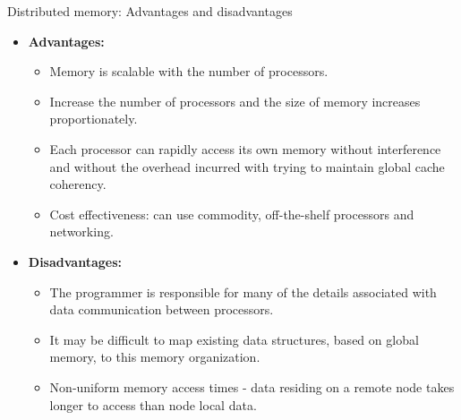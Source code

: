 \documentclass[10pt,times]{beamer}
\begin{document}
\begin{frame}{Distributed memory: Advantages and disadvantages}
\begin{itemize}

\item \textbf{Advantages:}
\begin{itemize}
\item Memory is scalable with the number of processors. 
\item Increase the number of processors and the size of memory increases 
proportionately.
\item Each processor can rapidly access its own memory without interference and 
    without the overhead incurred with trying to maintain global cache coherency.
\item Cost effectiveness: can use commodity, off-the-shelf processors and 
networking. 
\end{itemize}
\item \textbf{Disadvantages:}
\begin{itemize}
\item The programmer is responsible for many of the details associated with data 
    communication between processors.
\item It may be difficult to map existing data structures, based on global memory, 
to this memory organization.
\item Non-uniform memory access times - data residing on a remote node takes longer 
to access than node local data. 

\end{itemize}
\end{itemize}
\end{frame}
\end{document}
